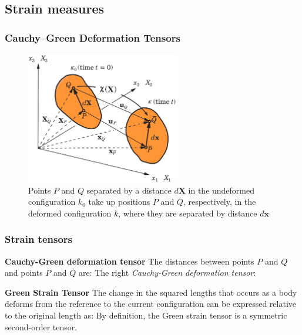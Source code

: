 \documentclass[notes]{beamer}
\begin{document}
\subsection{Strain measures}
\begin{frame}
\frametitle{Cauchy–Green Deformation Tensors}

\begin{figure}
	\includegraphics[width=0.6\textwidth]{figs/green-strain.png}
	\caption*{Points $P$ and $Q$ separated by a distance $d\mathbf{X}$ in the undeformed configuration $k_0$ take up positions $\bar{P}$ and $\bar{Q}$, respectively, in the deformed configuration $k$, where they are separated by distance $d\mathbf{x}$}
\end{figure}
\end{frame}

\begin{frame}
\frametitle{Strain tensors}
\textbf{Cauchy-Green deformation tensor}
The distances between points $P$ and $Q$ and points $\bar{P}$ and $\bar{Q}$ are:
The right \textit{Cauchy-Green deformation tensor}: 

\textbf{Green Strain Tensor}
The change in the squared lengths that occurs as a body deforms from the reference to the current configuration can be expressed relative to the original length as:
By definition, the Green strain tensor is a symmetric second-order tensor.
\end{frame}
\end{document}
